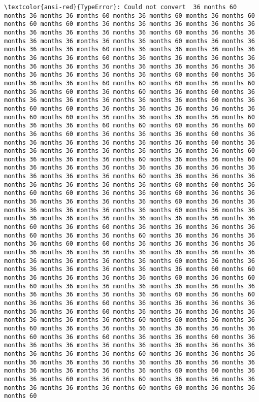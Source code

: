 \documentclass[11pt]{article}
\begin{document}
\begin{Verbatim}[commandchars=\\\{\}, frame=single, framerule=2mm, rulecolor=\color{outerrorbackground}]
\textcolor{ansi-red}{TypeError}: Could not convert  36 months 60 months 36 months 36 months 60 months 36 months 60 months 36 months 60 months 60 months 60 months 36 months 36 months 36 months 36 months 36 months 36 months 36 months 36 months 36 months 60 months 36 months 36 months 36 months 36 months 36 months 36 months 60 months 36 months 36 months 36 months 36 months 60 months 36 months 36 months 36 months 36 months 36 months 36 months 60 months 36 months 36 months 36 months 36 months 36 months 36 months 36 months 36 months 36 months 36 months 36 months 36 months 36 months 36 months 36 months 60 months 60 months 36 months 36 months 36 months 60 months 60 months 60 months 36 months 60 months 36 months 60 months 36 months 60 months 36 months 60 months 36 months 36 months 36 months 36 months 36 months 36 months 60 months 36 months 60 months 60 months 36 months 36 months 36 months 36 months 36 months 60 months 60 months 36 months 36 months 36 months 36 months 60 months 36 months 36 months 60 months 60 months 60 months 36 months 60 months 36 months 60 months 36 months 36 months 36 months 60 months 36 months 36 months 36 months 36 months 36 months 36 months 60 months 36 months 36 months 36 months 36 months 36 months 36 months 36 months 60 months 36 months 36 months 36 months 60 months 36 months 36 months 60 months 36 months 36 months 36 months 36 months 36 months 36 months 36 months 36 months 36 months 36 months 60 months 36 months 36 months 36 months 36 months 36 months 36 months 36 months 60 months 60 months 36 months 60 months 60 months 36 months 36 months 60 months 36 months 36 months 36 months 36 months 36 months 36 months 60 months 36 months 36 months 36 months 36 months 36 months 36 months 60 months 36 months 36 months 36 months 36 months 36 months 36 months 36 months 36 months 36 months 60 months 36 months 60 months 36 months 36 months 36 months 36 months 60 months 36 months 36 months 60 months 36 months 36 months 36 months 36 months 60 months 60 months 36 months 36 months 36 months 36 months 36 months 36 months 36 months 36 months 36 months 36 months 36 months 36 months 36 months 36 months 36 months 60 months 36 months 36 months 36 months 36 months 36 months 36 months 36 months 60 months 60 months 36 months 36 months 36 months 36 months 60 months 36 months 60 months 60 months 36 months 36 months 36 months 36 months 36 months 36 months 36 months 36 months 36 months 36 months 60 months 36 months 60 months 36 months 36 months 60 months 36 months 36 months 36 months 36 months 36 months 36 months 60 months 36 months 36 months 36 months 36 months 36 months 36 months 36 months 60 months 60 months 36 months 36 months 60 months 36 months 36 months 36 months 36 months 36 months 36 months 60 months 36 months 60 months 36 months 36 months 60 months 36 months 36 months 36 months 36 months 36 months 36 months 36 months 36 months 36 months 36 months 36 months 60 months 36 months 36 months 36 months 36 months 36 months 36 months 36 months 36 months 36 months 36 months 36 months 36 months 36 months 36 months 60 months 60 months 36 months 36 months 60 months 36 months 60 months 36 months 36 months 36 months 36 months 36 months 36 months 60 months 60 months 36 months 36 months 60 
\end{Verbatim}
\end{document}
